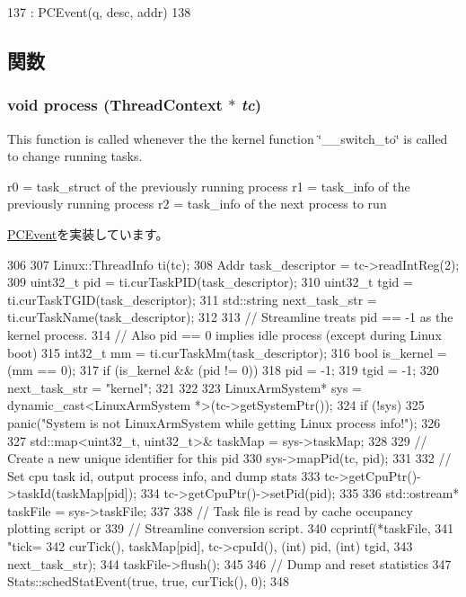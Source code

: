 \begin{DoxyCode}
137         : PCEvent(q, desc, addr)
138     {}
\end{DoxyCode}


\subsection{関数}
\hypertarget{classDumpStatsPCEvent_ad66a9d5ec7cfe597b848a17c0df5cc28}{
\subsubsection[{process}]{\setlength{\rightskip}{0pt plus 5cm}void process ({\bf ThreadContext} $\ast$ {\em tc})}}
\label{classDumpStatsPCEvent_ad66a9d5ec7cfe597b848a17c0df5cc28}
This function is called whenever the the kernel function \char`\"{}\_\-\_\-switch\_\-to\char`\"{} is called to change running tasks.

r0 = task\_\-struct of the previously running process r1 = task\_\-info of the previously running process r2 = task\_\-info of the next process to run 

\hyperlink{classPCEvent_af6ff225900b7b98c08880da7225b38f0}{PCEvent}を実装しています。


\begin{DoxyCode}
306 {
307     Linux::ThreadInfo ti(tc);
308     Addr task_descriptor = tc->readIntReg(2);
309     uint32_t pid = ti.curTaskPID(task_descriptor);
310     uint32_t tgid = ti.curTaskTGID(task_descriptor);
311     std::string next_task_str = ti.curTaskName(task_descriptor);
312 
313     // Streamline treats pid == -1 as the kernel process.
314     // Also pid == 0 implies idle process (except during Linux boot)
315     int32_t mm = ti.curTaskMm(task_descriptor);
316     bool is_kernel = (mm == 0);
317     if (is_kernel && (pid != 0)) {
318         pid = -1;
319         tgid = -1;
320         next_task_str = "kernel";
321     }
322 
323     LinuxArmSystem* sys = dynamic_cast<LinuxArmSystem *>(tc->getSystemPtr());
324     if (!sys) {
325         panic("System is not LinuxArmSystem while getting Linux process info!");
326     }
327     std::map<uint32_t, uint32_t>& taskMap = sys->taskMap;
328 
329     // Create a new unique identifier for this pid
330     sys->mapPid(tc, pid);
331 
332     // Set cpu task id, output process info, and dump stats
333     tc->getCpuPtr()->taskId(taskMap[pid]);
334     tc->getCpuPtr()->setPid(pid);
335 
336     std::ostream* taskFile = sys->taskFile;
337 
338     // Task file is read by cache occupancy plotting script or
339     // Streamline conversion script.
340     ccprintf(*taskFile,
341              "tick=%
342              curTick(), taskMap[pid], tc->cpuId(), (int) pid, (int) tgid,
343              next_task_str);
344     taskFile->flush();
345 
346     // Dump and reset statistics
347     Stats::schedStatEvent(true, true, curTick(), 0);
348 }
\end{DoxyCode}



